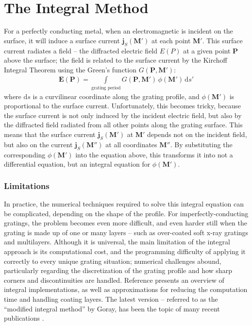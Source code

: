 \documentclass[singlespace,proposal]{uofsthesis-cs}
\newcommand{\dif}{\mathrm{d}}
\begin{document}
\section{The Integral Method}
For a perfectly conducting metal, when an electromagnetic is incident on the surface, it will induce a surface current $\mathbf{j}_S(\mathbf{M}')$ at each point $\mathbf{M}'$.  This surface current radiates a field -- the diffracted electric field $E(P)$ at a given point $\mathbf{P}$ above the surface; the field is related to the surface current by the Kirchoff Integral Theorem \cite{Kir83} using the Green's function $G(\mathbf{P}, \mathbf{M}')$:
\begin{eqnarray}
\mathbf{E}(\mathbf{P}) = \int\limits_{\textrm{grating period}} G(\mathbf{P}, \mathbf{M}')\, \phi(\mathbf{M}')\, \dif s'
\end{eqnarray}
where $\dif s$ is a curvilinear coordinate along the grating profile, and $\phi(\mathbf{M'})$ is proportional to the surface current.  Unfortunately, this becomes tricky, because the surface current is not only induced by the incident electric field, but also by the diffracted field radiated from all other points along the grating surface.  This means that the surface current $\mathbf{j}_S(\mathbf{M}')$ at $\mathbf{M}'$ depends not on the incident field, but also on the current $\mathbf{j}_S(\mathbf{M}'')$ at all coordinates $\mathbf{M}''$.  By substituting the corresponding $\phi(\mathbf{M'})$ into the equation above, this transforms it into not a differential equation, but an integral equation for $\phi(\mathbf{M'})$.  

\subsubsection{Limitations}
In practice, the numerical techniques required to solve this integral equation can be complicated, depending on the shape of the profile.  For imperfectly-conducting gratings, the problem becomes even more difficult, and even harder still when the grating is made up of one or many layers -- such as over-coated soft x-ray gratings and multilayers.  Although it is universal, the main limitation of the integral approach is its computational cost, and the programming difficulty of applying it correctly to every unique grating situation; numerical challenges abound, particularly regarding the discretization of the grating profile and how sharp corners and discontinuities are handled.  Reference \cite{Pom91} presents an overview of integral implementations, as well as approximations for reducing the computation time and handling coating layers. The latest version -- referred to as the ``modified integral method'' by Goray, has been the topic of many recent publications \cite{Gor02} \cite {Gor02b} \cite{See02} \cite{Gor05}.
\end{document}
